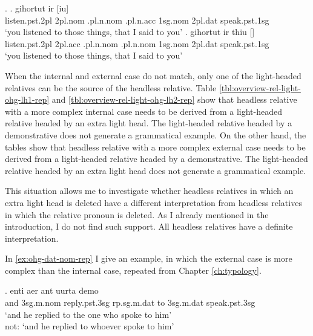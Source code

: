 \ex.
\ag. gihortut ir [iu]    \\
 listen.\ac{pst}.2\ac{pl}\scsub{[acc]} 2\ac{pl}.\ac{nom} .\ac{pl}.\ac{n}.\ac{nom} .\ac{pl}.\ac{n}.\ac{acc} 1\ac{sg}.\ac{nom} 2\ac{pl}.\ac{dat} speak.\ac{pst}.1\ac{sg}\scsub{[acc]}\\
 `you listened to those things, that I said to you' \label{ex:ohg-acc-acc-rep-elh}
\bg. gihortut ir thiu []   \\
 listen.\ac{pst}.2\ac{pl}\scsub{[acc]} 2\ac{pl}.\ac{acc} .\ac{pl}.\ac{n}.\ac{nom} .\ac{pl}.\ac{n}.\ac{nom} 1\ac{sg}.\ac{nom} 2\ac{pl}.\ac{dat} speak.\ac{pst}.1\ac{sg}\scsub{[acc]}\\
 `you listened to those things, that I said to you' \label{ex:ohg-acc-acc-rep-lh}

When the internal and external case do not match, only one of the light-headed relatives can be the source of the headless relative.
Table \ref{tbl:overview-rel-light-ohg-lh1-rep} and \ref{tbl:overview-rel-light-ohg-lh2-rep} show that headless relative with a more complex internal case needs to be derived from a light-headed relative headed by an extra light head. The light-headed relative headed by a demonstrative does not generate a grammatical example.
On the other hand, the tables show that headless relative with a more complex external case needs to be derived from a light-headed relative headed by a demonstrative. The light-headed relative headed by an extra light head does not generate a grammatical example.

This situation allows me to investigate whether headless relatives in which an extra light head is deleted have a different interpretation from headless relatives in which the relative pronoun is deleted. As I already mentioned in the introduction, I do not find such support. All headless relatives have a definite interpretation.

In \ref{ex:ohg-dat-nom-rep} I give an example, in which the external case is more complex than the internal case, repeated from Chapter \ref{ch:typology}.

\exg. enti aer {ant uurta} demo  \\
and 3\ac{sg}.\ac{m}.\ac{nom} reply.\ac{pst}.3\ac{sg}\scsub{[dat]} \ac{rp}.\ac{sg}.\ac{m}.\ac{dat} {to 3\ac{sg}.\ac{m}.\ac{dat}} speak.\ac{pst}.3\ac{sg}\scsub{[nom]}\\
`and he replied to the one who spoke to him'\\
not: `and he replied to whoever spoke to him'
 \label{ex:ohg-dat-nom-rep}


